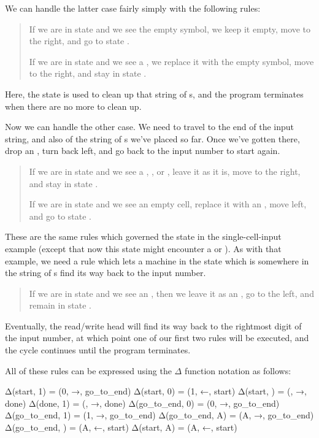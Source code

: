We can handle the latter case fairly simply with the following rules:

\begin{quote}
    If we are in state  and we see the empty symbol, we keep it empty, move to the right, and go to state .
    
    If we are in state  and we see a , we replace it with the empty symbol, move to the right, and stay in state .
\end{quote}

Here, the  state is used to clean up that string of s, and the program terminates when there are no more to clean up.

Now we can handle the other case. We need to travel to the end of the input string, and also of the string of s we've placed so far. Once we've gotten there, drop an , turn back left, and go back to the input number to start again.

\begin{quote}
    If we are in state  and we see a , , or , leave it as it is, move to the right, and stay in state .
    
    If we are in state  and we see an empty cell, replace it with an , move left, and go to state .
\end{quote}

These are the same rules which governed the  state in the single-cell-input example (except that now this state might encounter a  or ). As with that example, we need a rule which lets a machine in the  state which is somewhere in the string of s find its way back to the input number.

\begin{quote}
    If we are in state  and we see an , then we leave it as an , go to the left, and remain in state .
\end{quote}

Eventually, the read/write head will find its way back to the rightmost digit of the input number, at which point one of our first two rules will be executed, and the cycle continues until the program terminates.

All of these rules can be expressed using the $\Delta$ function notation as follows:
\label{program:binaryStringOfAs}
\begin{stdout}
Δ(start, 1) = (0, →, go_to_end)
Δ(start, 0) = (1, ←, start)
Δ(start, ) = (, →, done)
Δ(done, 1) = (, →, done)
Δ(go_to_end, 0) = (0, →, go_to_end)
Δ(go_to_end, 1) = (1, →, go_to_end)
Δ(go_to_end, A) = (A, →, go_to_end)
Δ(go_to_end, ) = (A, ←, start)
Δ(start, A) = (A, ←, start)
\end{stdout}

